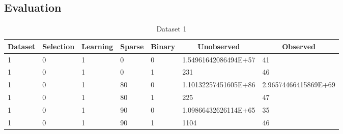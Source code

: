 \documentclass{article}
\theoremstyle{definition}
\begin{document}
\subsection{Evaluation}
\begin{table}[]
\centering
\caption{Dataset 1}
\label{my-label}
\begin{tabular}{|l|l|l|l|l|l|l|}
\hline
\multicolumn{1}{|c|}{\textbf{Dataset}} & \multicolumn{1}{c|}{\textbf{Selection}} & \multicolumn{1}{c|}{\textbf{Learning}} & \multicolumn{1}{c|}{\textbf{Sparse}} & \multicolumn{1}{c|}{\textbf{Binary}} & \multicolumn{1}{c|}{\textbf{Unobserved}} & \multicolumn{1}{c|}{\textbf{Observed}} \\ \hline
1                                      & 0                                       & 1                                      & 0                                    & 0                                      & 1.54961642086494E+57                     & 41                                     \\ \hline
1                                      & 0                                       & 1                                      & 0                                    & 1                                      & 231                                      & 46                                     \\ \hline
1                                      & 0                                       & 1                                      & 80                                   & 0                                      & 1.10132257451605E+86                     & 2.96574466415869E+69                   \\ \hline
1                                      & 0                                       & 1                                      & 80                                   & 1                                      & 225                                      & 47                                     \\ \hline
1                                      & 0                                       & 1                                      & 90                                   & 0                                      & 1.09866432626114E+65                     & 35                                     \\ \hline
1                                      & 0                                       & 1                                      & 90                                   & 1                                      & 1104                                     & 46                                     \\ \hline

\end{tabular}
\end{table}
\end{document}
